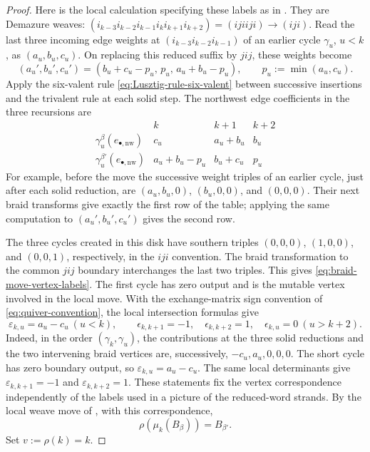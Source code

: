 \documentclass[12pt, reqno]{amsart}
\theoremstyle{plain}
\theoremstyle{definition}
\numberwithin{equation}{section}
\begin{document}
\begin{proof}
Here is the local calculation specifying these labels as in \cite[Figure~9-10]{casals2025cluster}. They are Demazure weaves: $(i_{k-3}i_{k-2}i_{k-1}i_ki_{k+1}i_{k+2})=(ijiiji)\to (iji)$. Read the last three
incoming edge weights at $(i_{k-3}i_{k-2}i_{k-1})$ of an earlier cycle \(\gamma_u\), \(u<k\),
as \((a_u,b_u,c_u)\). On replacing this reduced suffix by \(jij\),
these weights become
\[
 (a_u',b_u',c_u')
 =(b_u+c_u-p_u,\,p_u,\,a_u+b_u-p_u),
 \qquad p_u:=\min(a_u,c_u).
\]
Apply the six-valent rule
\eqref{eq:Lusztig-rule-six-valent} between successive insertions
and the trivalent rule at each solid step. The northwest edge
coefficients in the three recursions are
\begin{equation}\label{eq:braid-local-cycle-table}
\begin{array}{c|ccc}
 &k&k+1&k+2\\ \hline
 \gamma_u^\beta(e_{\bullet,\mathrm{nw}})
     &c_u&a_u+b_u&b_u\\
 \gamma_u^{\beta'}(e_{\bullet,\mathrm{nw}})
     &a_u+b_u-p_u&b_u+c_u&p_u
\end{array}
\end{equation}
For example, before the move the successive weight triples of an
earlier cycle, just after each solid reduction, are
\((a_u,b_u,0)\), \((b_u,0,0)\), and \((0,0,0)\).
Their next braid transforms give exactly the first row of the
table; applying the same computation to \((a_u',b_u',c_u')\)
gives the second row.

The three cycles created in this disk have southern triples
\((0,0,0)\), \((1,0,0)\), and \((0,0,1)\), respectively, in
the \(iji\) convention. The braid transformation to the common
\(jij\) boundary interchanges the last two triples. This gives
\eqref{eq:braid-move-vertex-labels}. The first cycle has zero
output and is the mutable vertex involved in the local move.
With the exchange-matrix sign convention of
\eqref{eq:quiver-convention}, the local intersection formulas give
\begin{equation}\label{eq:braid-local-exchange-column}
    \varepsilon_{k,u}=a_u-c_u\ (u<k),\qquad
    \epsilon_{k,k+1}=-1,\quad \epsilon_{k,k+2}=1,\quad
    \epsilon_{k,u}=0\ (u>k+2).
\end{equation}
Indeed, in the order \((\gamma_k,\gamma_u)\), the contributions
at the three solid reductions and the two intervening braid
vertices are, successively, \(-c_u,a_u,0,0,0\).
The short cycle has zero boundary output, so
\(\varepsilon_{k,u}=a_u-c_u\).
The same local determinants give
\(\varepsilon_{k,k+1}=-1\) and
\(\varepsilon_{k,k+2}=1\).
These statements fix the vertex correspondence independently of
the labels used in a picture of the reduced-word strands.
By the local weave move of
\cite[Proposition~4.46]{casals2025cluster}, with this correspondence,
\begin{equation}\label{eq:braid-move-exchange-matrix}
    \rho\!\left(\mu_k(B_\beta)\right)=B_{\beta'}.
\end{equation}
Set \(v:=\rho(k)=k\).


\end{proof}
\end{document}
